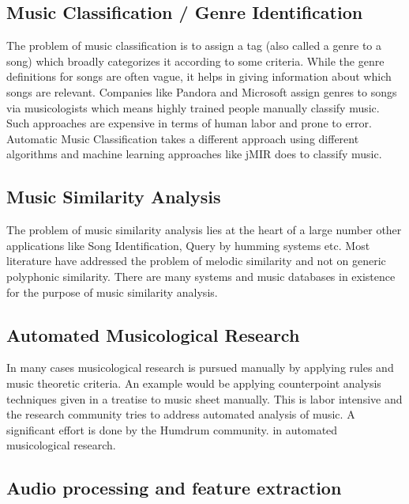 \subsection{Music Classification / Genre Identification}

\noindent The problem of music classification is to assign a tag (also called a genre to a song) which broadly categorizes it according to some criteria. While the genre definitions for songs are often vague, it helps in giving information about which songs are relevant. Companies like Pandora and Microsoft assign genres to songs via musicologists \cite{genreclassification} which means highly trained people manually classify music. Such approaches are expensive in terms of human labor and prone to error. Automatic Music Classification takes a different approach using different algorithms and machine learning approaches like jMIR \cite{jMIR} does to classify music. 

\subsection{Music Similarity Analysis}

\noindent The problem of music similarity analysis lies at the heart of a large number other applications like Song Identification, Query by humming systems etc. Most literature have addressed the problem of melodic similarity \cite{simsurvey} and not on generic polyphonic similarity. There are many systems and music databases in existence for the purpose of music similarity analysis.

\subsection{Automated Musicological Research}

\noindent In many cases musicological research is pursued manually by applying rules and music theoretic criteria. An example would be applying counterpoint analysis techniques given in a treatise \cite{theorytreatise} to music sheet manually. This is labor intensive and the research community tries to address automated analysis of music. A significant effort is done by the Humdrum community. \cite{humdrum} in automated musicological research. 

\subsection{Audio processing and feature extraction}

